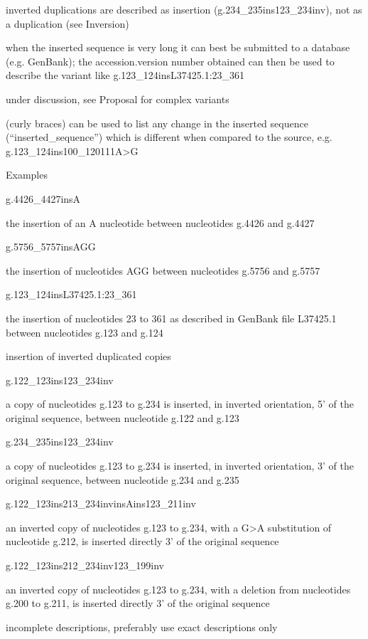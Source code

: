 \documentclass{book}
\begin{document}
	inverted duplications are described as insertion (g.234\_235ins123\_234inv), not as a duplication (see Inversion)

	when the inserted sequence is very long it can best be submitted to a database (e.g. GenBank); the accession.version number obtained can then be used to describe the variant like g.123\_124insL37425.1:23\_361

	under discussion, see Proposal for complex variants

	{ } (curly braces) can be used to list any change in the inserted sequence (“inserted\_sequence”) which is different when compared to the source, e.g. g.123\_124ins100\_120{111A>G}

	

	

	Examples

	g.4426\_4427insA

	the insertion of an A nucleotide between nucleotides g.4426 and g.4427

	g.5756\_5757insAGG

	the insertion of nucleotides AGG between nucleotides g.5756 and g.5757

	g.123\_124insL37425.1:23\_361

	the insertion of nucleotides 23 to 361 as described in GenBank file L37425.1 between nucleotides g.123 and g.124

	insertion of inverted duplicated copies 

	g.122\_123ins123\_234inv

	a copy of nucleotides g.123 to g.234 is inserted, in inverted orientation, 5’ of the original sequence, between nucleotide g.122 and g.123

	g.234\_235ins123\_234inv

	a copy of nucleotides g.123 to g.234 is inserted, in inverted orientation, 3’ of the original sequence, between nucleotide g.234 and g.235

	g.122\_123ins213\_234invinsAins123\_211inv

	an inverted copy of nucleotides g.123 to g.234, with a G>A substitution of nucleotide g.212, is inserted directly 3’ of the original sequence

	g.122\_123ins212\_234inv123\_199inv

	an inverted copy of nucleotides g.123 to g.234, with a deletion from nucleotides g.200 to g.211, is inserted directly 3’ of the original sequence

	incomplete descriptions, preferably use exact descriptions only 
\end{document}
